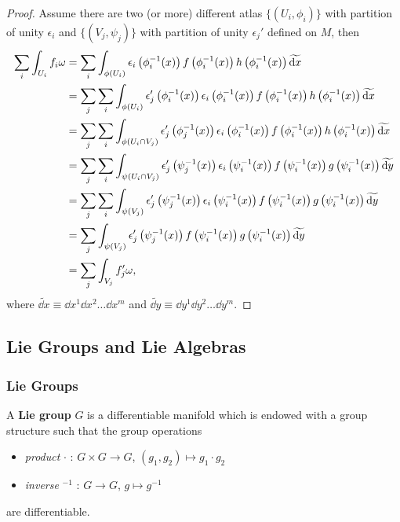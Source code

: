 \documentclass[10pt]{article}
\begin{document}
\begin{proof}
    Assume there are two (or more) different atlas $\{(U_i,\phi_i)\}$ with partition of unity $\epsilon_i$ and $\{(V_j,\psi_j)\}$ with partition of unity $\epsilon_j'$ defined on $M$, then
    \begin{align}
        \sum_i\int_{U_i}f_i\omega & =\sum_i\int_{\phi(U_i)}\epsilon_i\left(\phi_{i}^{-1}(x)\right) f\left(\phi_{i}^{-1}(x)\right)h\left(\phi_{i}^{-1}(x)\right)\widetilde{\dd{x}}\notag                                                        \\
                                  & =\sum_j \sum_i\int_{\phi(U_i)}\epsilon_j'\left(\phi_{i}^{-1}(x)\right)\epsilon_i\left(\phi_{i}^{-1}(x)\right) f\left(\phi_{i}^{-1}(x)\right)h\left(\phi_{i}^{-1}(x)\right)\widetilde{\dd{x}}\notag         \\
                                  & =\sum_j \sum_i\int_{\phi(U_i\cap V_j)}\epsilon_j'\left(\phi_{j}^{-1}(x)\right)\epsilon_i\left(\phi_{i}^{-1}(x)\right) f\left(\phi_{i}^{-1}(x)\right)h\left(\phi_{i}^{-1}(x)\right)\widetilde{\dd{x}}\notag \\
                                  & =\sum_j \sum_i\int_{\psi(U_i\cap V_j)}\epsilon_j'\left(\psi_{j}^{-1}(x)\right)\epsilon_i\left(\psi_{i}^{-1}(x)\right) f\left(\psi_{i}^{-1}(x)\right)g\left(\psi_{i}^{-1}(x)\right)\widetilde{\dd{y}}\notag \\
                                  & =\sum_j \sum_i\int_{\psi(V_j)}\epsilon_j'\left(\psi_{j}^{-1}(x)\right)\epsilon_i\left(\psi_{i}^{-1}(x)\right) f\left(\psi_{i}^{-1}(x)\right)g\left(\psi_{i}^{-1}(x)\right)\widetilde{\dd{y}}\notag         \\
                                  & =\sum_j \int_{\psi(V_j)}\epsilon_j'\left(\psi_{j}^{-1}(x)\right) f\left(\psi_{i}^{-1}(x)\right)g\left(\psi_{i}^{-1}(x)\right)\widetilde{\dd{y}}\notag                                                      \\
                                  & =\sum_j \int_{V_j}f_j'\omega,\notag
    \end{align}
    where $\widetilde{\dd{x}}\equiv\dd{x^1} \dd{x^2} \dots \dd{x^m}$ and $\widetilde{\dd{y}}\equiv\dd{y^1} \dd{y^2} \dots \dd{y^m}$.
\end{proof}
\subsection{Lie Groups and Lie Algebras}
\subsubsection{Lie Groups}
\begin{definition}
    A \textbf{Lie group} $G$ is a differentiable manifold which is endowed with a group structure such that the group operations
    \begin{itemize}
        \item \textit{product} $\cdot$ : $G\times G\to G$, $(g_1,g_2)\mapsto g_1\cdot g_2$
        \item \textit{inverse} $^{-1}$ : $G\to G$, $g\mapsto g^{-1}$
    \end{itemize}
    are differentiable.
\end{definition}
\end{document}
